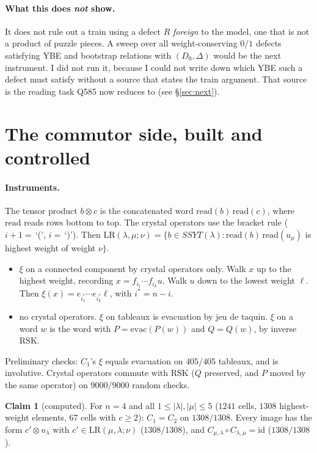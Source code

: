 \documentclass[11pt]{article}
\theoremstyle{definition}
\newtheorem{claim}{Claim}
\theoremstyle{remark}
\newcommand{\LR}{\mathrm{LR}}
\begin{document}
\paragraph{What this does \emph{not} show.} It does not rule out a train using a defect
$R$ \emph{foreign} to the model, one that is not a product of puzzle pieces. A sweep
over all weight-conserving $0/1$ defects satisfying YBE and bootstrap relations with
$(D_0,\Delta)$ would be the next instrument. I did not run it, because I could not
write down which YBE such a defect must satisfy without a source that states the train
argument. That source is the reading task Q585 now reduces to (see \S\ref{sec:next}).

\section{The commutor side, built and controlled}

\paragraph{Instruments.} The tensor product $b\otimes c$ is the concatenated word
$\mathrm{read}(b)\,\mathrm{read}(c)$, where $\mathrm{read}$ reads rows bottom to top.
The crystal operators use the bracket rule ($i{+}1=\,$`(', $i=\,$`)'). Then
$\LR(\lambda,\mu;\nu)=\{b\in SSYT(\lambda):\mathrm{read}(b)\,\mathrm{read}(u_\mu)$ is
highest weight of weight $\nu\}$.
\begin{itemize}
\item[$C_1$:] $\xi$ on a connected component by crystal operators only. Walk $x$ up to
  the highest weight, recording $x=f_{i_1}\cdots f_{i_k}u$. Walk $u$ down to the lowest
  weight $\ell$. Then $\xi(x)=e_{i_1^*}\cdots e_{i_k^*}\ell$, with $i^*=n-i$.
\item[$C_2$:] no crystal operators. $\xi$ on tableaux is evacuation by jeu de taquin.
  $\xi$ on a word $w$ is the word with $P=\mathrm{evac}(P(w))$ and $Q=Q(w)$, by inverse
  RSK.
\end{itemize}
Preliminary checks: $C_1$'s $\xi$ equals evacuation on $405/405$ tableaux, and is
involutive. Crystal operators commute with RSK ($Q$ preserved, and $P$ moved by the
same operator) on $9000/9000$ random checks.

\begin{claim}[computed]\label{cl:C}
For $n=4$ and all $1\le|\lambda|,|\mu|\le5$ ($1241$ cells, $1308$ highest-weight
elements, $67$ cells with $c\ge2$):
$C_1=C_2$ on $1308/1308$. Every image has the form $c'\otimes u_\lambda$ with
$c'\in\LR(\mu,\lambda;\nu)$ ($1308/1308$), and $C_{\mu,\lambda}\circ C_{\lambda,\mu}=\mathrm{id}$
($1308/1308$).
\end{claim}
\end{document}
